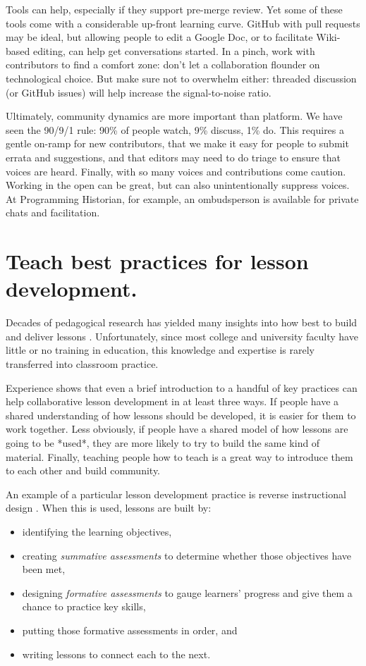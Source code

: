 \documentclass[10pt,letterpaper]{article}
\newcommand{\rulemajor}[1]{\section{#1}}
\begin{document}
Tools can help,
especially if they support pre-merge review.
Yet some of these tools come with a considerable up-front learning curve.
GitHub with pull requests may be ideal,
but allowing people to edit a Google Doc,
or to facilitate Wiki-based editing,
can help get conversations started.
In a pinch,
work with contributors to find a comfort zone:
don't let a collaboration flounder on technological choice.
But make sure not to overwhelm either:
threaded discussion (or GitHub issues) will help increase the signal-to-noise ratio.

Ultimately,
community dynamics are more important than platform.
We have seen the 90/9/1 rule:
90\% of people watch, 9\% discuss, 1\% do.
This requires a gentle on-ramp for new contributors,
that we make it easy for people to submit errata and suggestions,
and that editors may need to do triage to ensure that voices are heard.
Finally, with so many voices and contributions come caution.
Working in the open can be great,
but can also unintentionally suppress voices.
At Programming Historian,
for example,
an ombudsperson is available for private chats and facilitation.

\rulemajor{Teach best practices for lesson development.}

Decades of pedagogical research has yielded many insights into
how best to build and deliver lessons \cite{hlw}.
Unfortunately,
since most college and university faculty have little or no training in education,
this knowledge and expertise is rarely transferred into classroom practice.

Experience shows that even a brief introduction to a handful of key practices
can help collaborative lesson development in at least three ways.
If people have a shared understanding of how lessons should be developed,
it is easier for them to work together.
Less obviously,
if people have a shared model of how lessons are going to be *used*,
they are more likely to try to build the same kind of material.
Finally,
teaching people how to teach is a great way to introduce them to each other and build community.

An example of a particular lesson development practice is reverse instructional design
\cite{wiggins-mctighe}.
When this is used,
lessons are built by:

\begin{itemize}

\item
  identifying the learning objectives,

\item
  creating \emph{summative assessments} to determine whether those objectives have been met,

\item
  designing \emph{formative assessments} to gauge learners' progress
  and give them a chance to practice key skills,

\item
  putting those formative assessments in order,
  and

\item
  writing lessons to connect each to the next.

\end{itemize}
\end{document}
